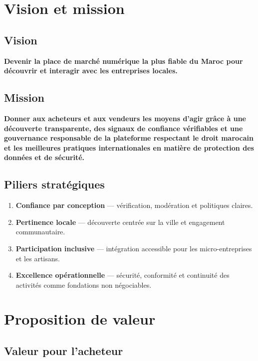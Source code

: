 \section{Vision et mission}

\subsection{Vision}

\textbf{Devenir la place de marché numérique la plus fiable du Maroc pour découvrir et interagir avec les entreprises locales.}

\subsection{Mission}

\textbf{Donner aux acheteurs et aux vendeurs les moyens d'agir grâce à une découverte transparente, des signaux de confiance vérifiables et une gouvernance responsable de la plateforme respectant le droit marocain et les meilleures pratiques internationales en matière de protection des données et de sécurité.}

\subsection{Piliers stratégiques}

\begin{enumerate}
  \item \textbf{Confiance par conception} --- vérification, modération et politiques claires.
  \item \textbf{Pertinence locale} --- découverte centrée sur la ville et engagement communautaire.
  \item \textbf{Participation inclusive} --- intégration accessible pour les micro-entreprises et les artisans.
  \item \textbf{Excellence opérationnelle} --- sécurité, conformité et continuité des activités comme fondations non négociables.
\end{enumerate}

\section{Proposition de valeur}

\subsection{Valeur pour l'acheteur}

